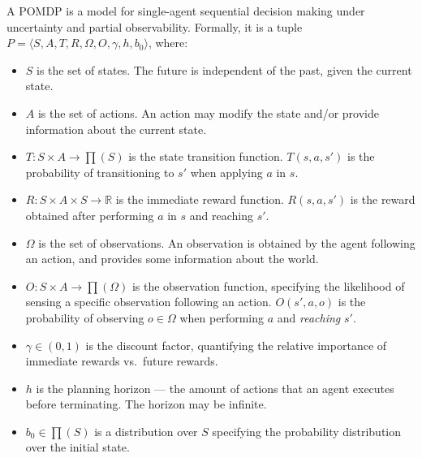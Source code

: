 \documentclass[letterpaper]{article} %
\theoremstyle{definition}
\newcommand{\eliran}[1]{\textbf{[\color{red}ELIRAN:#1]}}
\newcommand{\ronen}[1]{\textbf{[\color{blue}RONEN:#1]}}
\begin{document}
A POMDP is a model for single-agent sequential decision making under uncertainty and partial observability.
Formally, it is a tuple $P=\langle S, A, T, R, \Omega, O, \gamma, h, b_0 \rangle$, where:
\begin{itemize}
\item
$S$ is the set of states. The future is independent of the past, given the current state.
\item
$A$ is the set of actions. An action may modify the state and/or
provide information about the current state.
\item
$T: S \times A \rightarrow \prod(S)$ is the state transition function.  $T(s, a, s')$ is the probability of transitioning to $s'$ when applying $a$ in $s$. 
\item
$R:S \times A \times S \rightarrow \mathbb{R}$  is the immediate reward function. $R(s,a, s')$ is the reward obtained after performing $a$ in $s$  and reaching $s'$. 
\item
$\Omega$ is the set of observations. An observation is obtained by the agent following an action, and provides some  information about the world.
\item
$O:S \times A \rightarrow \prod (\Omega)$ is the observation function, specifying the likelihood of sensing a specific observation following an action. $O(s', a, o)$ is the probability of observing $o\in \Omega$ when performing $a$ and \emph{reaching} $s'$. 
\item
$\gamma \in (0,1)$ is the discount factor, quantifying the relative importance of immediate rewards vs.~future rewards.
\item
$h$ is the planning horizon --- the amount of actions that an agent executes before terminating. The horizon may be infinite.

\item
$b_0\in \prod(S)$ is a distribution over $S$ specifying the probability distribution over the initial state.
\end{itemize}
\end{document}
